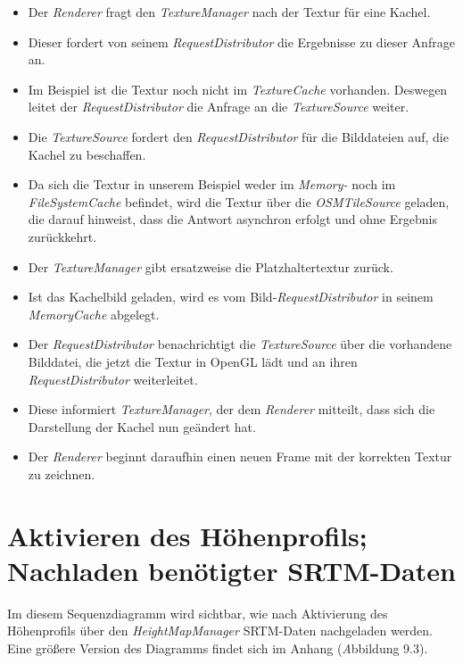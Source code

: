 \documentclass[10pt]{scrreprt}
\newcommand{\textref}[1]{\mbox{\raisebox{0.1ex}{\small$\rightarrow$ }\textit{#1}}}
\begin{document}
\begin{itemize}
\item Der \textit{Renderer} fragt den \textit{TextureManager} nach der Textur für eine Kachel.
\item Dieser fordert von seinem \textit{RequestDistributor} die Ergebnisse zu dieser Anfrage an.
\item Im Beispiel ist die Textur noch nicht im \textit{TextureCache} vorhanden. Deswegen leitet der \textit{RequestDistributor} die Anfrage an die \textit{TextureSource} weiter.
\item Die \textit{TextureSource} fordert den \textit{RequestDistributor} für die Bilddateien auf, die Kachel zu beschaffen.
\item Da sich die Textur in unserem Beispiel weder im \textit{Memory-} noch im \textit{FileSystemCache} befindet, wird die Textur über die \textit{OSMTileSource} geladen, die darauf hinweist, dass die Antwort asynchron erfolgt und ohne Ergebnis zurückkehrt.
\item Der \textit{TextureManager} gibt ersatzweise die Platzhaltertextur zurück.
\item Ist das Kachelbild geladen, wird es vom Bild-\textit{RequestDistributor} in seinem \textit{MemoryCache} abgelegt.
\item Der \textit{RequestDistributor} benachrichtigt die \textit{TextureSource} über die vorhandene Bilddatei, die jetzt die Textur in OpenGL lädt und an ihren \textit{RequestDistributor} weiterleitet.
\item Diese informiert \textit{TextureManager}, der dem \textit{Renderer} mitteilt, dass sich die Darstellung der Kachel nun geändert hat.
\item Der \textit{Renderer} beginnt daraufhin einen neuen Frame mit der korrekten Textur zu zeichnen.
\end{itemize}


\newpage

\section{Aktivieren des Höhenprofils; Nachladen benötigter SRTM-Daten}
Im diesem Sequenzdiagramm wird sichtbar, wie nach Aktivierung des Höhenprofils über den \textit{HeightMapManager} SRTM-Daten nachgeladen werden.
Eine größere Version des Diagramms findet sich im Anhang (\textref Abbildung 9.3).
\end{document}
